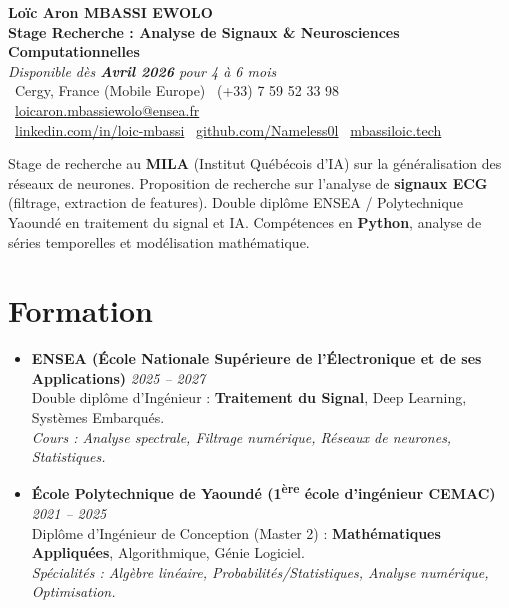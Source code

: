 \documentclass[a4paper,11pt]{article}
\begin{document}
\begin{center}
    {\Large \textbf{Loïc Aron MBASSI EWOLO}} \\ \vspace{4pt}
    \textbf{\large Stage Recherche : Analyse de Signaux \& Neurosciences Computationnelles} \\
    \textit{\small Disponible dès \textbf{Avril 2026} pour 4 à 6 mois} \\ \vspace{4pt}
    \small
    \faMapMarker\ Cergy, France (Mobile Europe) \quad
    \faPhone\ (+33) 7 59 52 33 98 \quad
    \faEnvelope\ \href{mailto:loicaron.mbassiewolo@ensea.fr}{loicaron.mbassiewolo@ensea.fr} \\ \vspace{2pt}
    \faLinkedin\ \href{https://www.linkedin.com/in/loic-mbassi/}{linkedin.com/in/loic-mbassi} \quad
    \faGithub\ \href{https://github.com/Nameless0l}{github.com/Nameless0l} \quad
    \faGlobe\ \href{https://mbassiloic.tech}{mbassiloic.tech}
\end{center}

\vspace{-2pt}

\noindent\small{Stage de recherche au \textbf{MILA} (Institut Québécois d'IA) sur la généralisation des réseaux de neurones. Proposition de recherche sur l'analyse de \textbf{signaux ECG} (filtrage, extraction de features). Double diplôme ENSEA / Polytechnique Yaoundé en traitement du signal et IA. Compétences en \textbf{Python}, analyse de séries temporelles et modélisation mathématique.}

\section{Formation}
\begin{itemize}[leftmargin=*, label=\tiny$\bullet$, nosep]
    \item \textbf{ENSEA (École Nationale Supérieure de l'Électronique et de ses Applications)} \hfill \textit{2025 -- 2027} \\
    \small{Double diplôme d'Ingénieur : \textbf{Traitement du Signal}, Deep Learning, Systèmes Embarqués.} \\
    \textit{\small{Cours : Analyse spectrale, Filtrage numérique, Réseaux de neurones, Statistiques.}}
    \vspace{4pt}
    \item \textbf{École Polytechnique de Yaoundé (1\textsuperscript{ère} école d'ingénieur CEMAC)} \hfill \textit{2021 -- 2025} \\
    \small{Diplôme d'Ingénieur de Conception (Master 2) : \textbf{Mathématiques Appliquées}, Algorithmique, Génie Logiciel.} \\
    \textit{\small{Spécialités : Algèbre linéaire, Probabilités/Statistiques, Analyse numérique, Optimisation.}}
\end{itemize}
\end{document}
